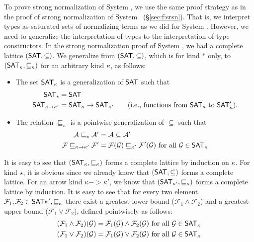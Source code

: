 To prove strong normalization of System \F, we use the same proof strategy
as in the proof of strong normalization of System \F\ (\S\ref{sec:f:srsn}).
That is, we interpret types as saturated sets of normalizing terms as we did
for System \F. However, we need to generalize the interpretation of types to
the interpretation of type constructors. In the strong normalization proof of
System \F, we had a complete lattice $(\mathsf{SAT},\subseteq)$. We generalize from
$(\mathsf{SAT},\subseteq)$, which is for kind $*$ only, to
$(\mathsf{SAT}_\kappa,\sqsubseteq_\kappa)$ for an arbitrary kind $\kappa$,
as follows:
\begin{itemize}
\item The set $\mathsf{SAT}_\kappa$ is a generalization of $\mathsf{SAT}$ such that
\begin{align*}
        \mathsf{SAT}_{*} &= \mathsf{SAT} \\
        \mathsf{SAT}_{\kappa -> \kappa'} &= \mathsf{SAT}_\kappa -> \mathsf{SAT}_{\kappa'}
        \qquad \text{({i.e.}, functions from $\mathsf{SAT}_\kappa$ to $\mathsf{SAT}_\kappa'$)}.
\end{align*}

\item The relation $\sqsubseteq_\kappa$ is
        a pointwise generalization of $\subseteq$ such that
\begin{align*}
\mathcal{A} \sqsubseteq_{*} \mathcal{A'} &= \mathcal{A} \subseteq \mathcal{A'}\\
\mathcal{F} \sqsubseteq_{\kappa -> \kappa'} \mathcal{F'} &=
        \mathcal{F}(\mathcal{G}) \sqsubseteq_{\kappa'} \mathcal{F'}(\mathcal{G})
        ~\text{for all}~\mathcal{G}\in\mathsf{SAT}_\kappa
\end{align*}
\end{itemize}
It is easy to see that $(\mathsf{SAT}_\kappa,\sqsubseteq_\kappa)$ forms
a complete lattice by induction on $\kappa$. For kind $\star$,
it is obvious since we already know that $(\mathsf{SAT},\subseteq)$ forms
a complete lattice. For an arrow kind $\kappa -> \kappa'$, we know that
$(\mathsf{SAT}_{\kappa'},\sqsubseteq_{\kappa})$ forms a complete lattice by induction.
It is easy to see that for every two element $\mathcal{F}_1, \mathcal{F}_2
\in \mathsf{SAT}{\kappa'},\sqsubseteq_{\kappa}$ there exist a greatest lower bound
($\mathcal{F}_1 \wedge \mathcal{F}_2$) and a greatest upper bound 
($\mathcal{F}_1 \vee \mathcal{F}_2$), defined pointwisely as follows:
\begin{align*}
(\mathcal{F}_1 \wedge \mathcal{F}_2)(\mathcal{G}) &=
   \mathcal{F}_1(\mathcal{G}) \wedge \mathcal{F}_2(\mathcal{G})
        ~\text{for all}~\mathcal{G}\in\mathsf{SAT}_\kappa \\
(\mathcal{F}_1 \vee \mathcal{F}_2)(\mathcal{G}) &=
   \mathcal{F}_1(\mathcal{G}) \vee \mathcal{F}_2(\mathcal{G})
        ~\text{for all}~\mathcal{G}\in\mathsf{SAT}_\kappa
\end{align*}
